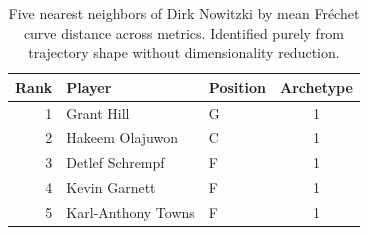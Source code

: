 \begin{table}[htbp]
  \centering\small
  \begin{tabular}{rllc}
    \toprule
    Rank & Player & Position & Archetype \\
    \midrule
    1 & Grant Hill & G & 1 \\
    2 & Hakeem Olajuwon & C & 1 \\
    3 & Detlef Schrempf & F & 1 \\
    4 & Kevin Garnett & F & 1 \\
    5 & Karl-Anthony Towns & F & 1 \\
    \bottomrule
  \end{tabular}
  \caption{Five nearest neighbors of Dirk Nowitzki by mean Fr\'{e}chet curve distance across metrics. Identified purely from trajectory shape without dimensionality reduction.}
  \label{tab:Dirk_Nowitzki_frechet_curve_neighbors}
\end{table}


